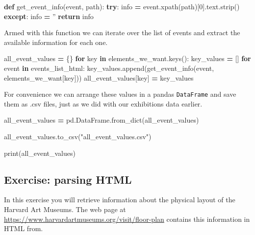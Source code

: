 \documentclass[]{book}
\newenvironment{Shaded}{\begin{snugshade}}{\end{snugshade}}
\newcommand{\KeywordTok}[1]{\textcolor[rgb]{0.13,0.29,0.53}{\textbf{#1}}}
\newcommand{\DecValTok}[1]{\textcolor[rgb]{0.00,0.00,0.81}{#1}}
\newcommand{\StringTok}[1]{\textcolor[rgb]{0.31,0.60,0.02}{#1}}
\newcommand{\ControlFlowTok}[1]{\textcolor[rgb]{0.13,0.29,0.53}{\textbf{#1}}}
\newcommand{\OperatorTok}[1]{\textcolor[rgb]{0.81,0.36,0.00}{\textbf{#1}}}
\newcommand{\BuiltInTok}[1]{#1}
\newcommand{\NormalTok}[1]{#1}
\begin{document}
\begin{Shaded}
\begin{Highlighting}[]
\KeywordTok{def}\NormalTok{ get_event_info(event, path):}
    \ControlFlowTok{try}\NormalTok{:}
\NormalTok{        info }\OperatorTok{=}\NormalTok{ event.xpath(path)[}\DecValTok{0}\NormalTok{].text.strip()}
    \ControlFlowTok{except}\NormalTok{:}
\NormalTok{        info }\OperatorTok{=} \StringTok{''}
    \ControlFlowTok{return}\NormalTok{ info}
\end{Highlighting}
\end{Shaded}

Armed with this function we can iterate over the list of events and
extract the available information for each one.

\begin{Shaded}
\begin{Highlighting}[]
\NormalTok{all_event_values }\OperatorTok{=}\NormalTok{ \{\}}
\ControlFlowTok{for}\NormalTok{ key }\KeywordTok{in}\NormalTok{ elements_we_want.keys():}
\NormalTok{    key_values }\OperatorTok{=}\NormalTok{ []}
    \ControlFlowTok{for}\NormalTok{ event }\KeywordTok{in}\NormalTok{ events_list_html: }
\NormalTok{        key_values.append(get_event_info(event, elements_we_want[key]))}
\NormalTok{    all_event_values[key] }\OperatorTok{=}\NormalTok{ key_values}
\end{Highlighting}
\end{Shaded}

For convenience we can arrange these values in a pandas
\texttt{DataFrame} and save them as .csv files, just as we did with our
exhibitions data earlier.

\begin{Shaded}
\begin{Highlighting}[]
\NormalTok{all_event_values }\OperatorTok{=}\NormalTok{ pd.DataFrame.from_dict(all_event_values)}

\NormalTok{all_event_values.to_csv(}\StringTok{"all_event_values.csv"}\NormalTok{)}

\BuiltInTok{print}\NormalTok{(all_event_values)}
\end{Highlighting}
\end{Shaded}

\subsection{Exercise: parsing HTML}\label{exercise-parsing-html}

In this exercise you will retrieve information about the physical layout
of the Harvard Art Museums. The web page at
\url{https://www.harvardartmuseums.org/visit/floor-plan} contains this
information in HTML from.
\end{document}
